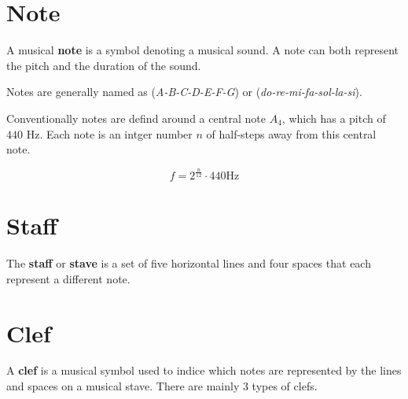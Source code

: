 \documentclass[a4paper]{article}
\author{Paolo Bettelini}
\date{}
\begin{document}
\maketitle
\tableofcontents
\pagebreak

\section{Note}

A musical \textbf{note} is a symbol denoting a musical sound.
A note can both represent the pitch and the duration of the sound.

Notes are generally named as (\textit{A-B-C-D-E-F-G}) or (\textit{do-re-mi-fa-sol-la-si}).

Conventionally notes are defind around a central note \(A_4\), which has a pitch of
\(440\) Hz. Each note is an intger number \(n\) of half-steps away from this central note.

\[
    f = 2^\frac{n}{12} \cdot 440 \text{Hz}
\]

\section{Staff}

The \textbf{staff} or \textbf{stave} is a set of five horizontal lines and four spaces that each represent a different
note.


\section{Clef}

A \textbf{clef} is a musical symbol used to indice which notes are represented
by the lines and spaces on a musical stave.
There are mainly 3 types of clefs.
\end{document}
